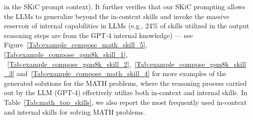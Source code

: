 in the SKiC prompt context). It further verifies that our SKiC prompting allows the LLMs to generalize beyond the in-context skills and invoke the massive reservoir of internal capabilities in LLMs (e.g., 24\% of skills utilized in the output reasoning steps are from the GPT-4 internal knowledge) --- see Figure~\ref{Tab:example_compose_math_skill_5}, \ref{Tab:example_compose_gsm8k_skill_1}, ~\ref{Tab:example_compose_gsm8k_skill_2},~\ref{Tab:example_compose_gsm8k_skill_3} and~\ref{Tab:example_compose_math_skill_4} for more examples of the generated solutions for the MATH problems, where the reasoning process carried out by the LLM (GPT-4) effectively utilize both in-context and internal skills. In Table~\ref{Tab:math_top_skills}, we also report the most frequently used in-context and internal skills for solving MATH problems.








